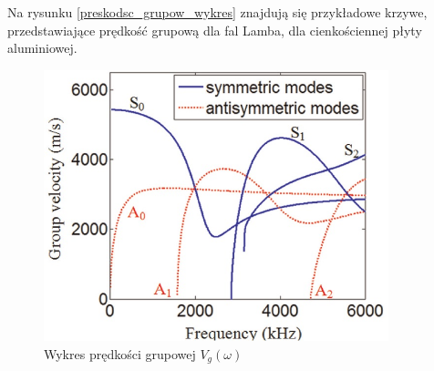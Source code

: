Na rysunku \ref{preskodsc_grupow_wykres} znajdują się przykładowe krzywe, przedstawiające prędkość grupową dla fal Lamba, dla cienkościennej płyty aluminiowej.

\begin{figure}[h]
\centering
\includegraphics[width=10cm]{Zdjecia/2/predkosc_grupowa_wykres}
\caption{Wykres prędkości grupowej \(V_g(\omega)\)}
\label{fig:preskodsc_grupow_wykres}
\end{figure}





























